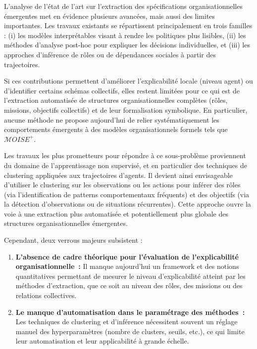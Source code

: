 L’analyse de l’état de l’art sur l’extraction des spécifications organisationnelles émergentes met en évidence plusieurs avancées, mais aussi des limites importantes. Les travaux existants se répartissent principalement en trois familles : (i) les modèles interprétables visant à rendre les politiques plus lisibles, (ii) les méthodes d’analyse post-hoc pour expliquer les décisions individuelles, et (iii) les approches d’inférence de rôles ou de dépendances sociales à partir des trajectoires.

Si ces contributions permettent d’améliorer l’explicabilité locale (niveau agent) ou d’identifier certains schémas collectifs, elles restent limitées pour ce qui est de l’extraction automatisée de structures organisationnelles complètes (rôles, missions, objectifs collectifs) et de leur formalisation symbolique. En particulier, aucune méthode ne propose aujourd’hui de relier systématiquement les comportements émergents à des modèles organisationnels formels tels que $\mathcal{M}OISE^+$.

Les travaux les plus prometteurs pour répondre à ce sous-problème proviennent du domaine de l’apprentissage non supervisé, et en particulier des techniques de clustering appliquées aux trajectoires d’agents. Il devient ainsi envisageable d’utiliser le clustering sur les observations ou les actions pour inférer des rôles (via l’identification de patterns comportementaux fréquents) et des objectifs (via la détection d’observations ou de situations récurrentes). Cette approche ouvre la voie à une extraction plus automatisée et potentiellement plus globale des structures organisationnelles émergentes.

Cependant, deux verrous majeurs subsistent :
\begin{enumerate}
  \item \textbf{L’absence de cadre théorique pour l’évaluation de l’explicabilité organisationnelle~:} Il manque aujourd’hui un framework et des notions quantitatives permettant de mesurer le niveau d’explicabilité atteint par les méthodes d’extraction, que ce soit au niveau des rôles, des missions ou des relations collectives.
  \item \textbf{Le manque d’automatisation dans le paramétrage des méthodes~:} Les techniques de clustering et d’inférence nécessitent souvent un réglage manuel des hyperparamètres (nombre de clusters, seuils, etc.), ce qui limite leur automatisation et leur applicabilité à grande échelle.
\end{enumerate}

